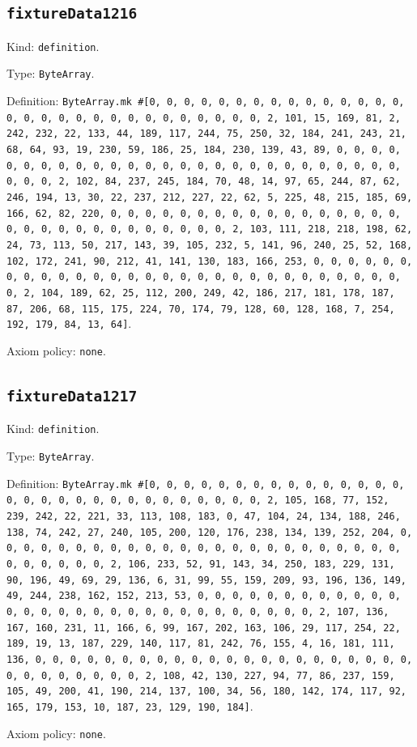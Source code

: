 \documentclass[11pt]{article}
\begin{document}
\subsection*{\texttt{fixtureData1216}}
\noindent Kind: \texttt{definition}.\par
\noindent Type: \texttt{ByteArray}.\par
\noindent Definition: \texttt{ByteArray.mk \#[0, 0, 0, 0, 0, 0, 0, 0, 0, 0, 0, 0, 0, 0, 0, 0, 0, 0, 0, 0, 0, 0, 0, 0, 0, 0, 0, 0, 0, 0, 2, 101, 15, 169, 81, 2, 242, 232, 22, 133, 44, 189, 117, 244, 75, 250, 32, 184, 241, 243, 21, 68, 64, 93, 19, 230, 59, 186, 25, 184, 230, 139, 43, 89, 0, 0, 0, 0, 0, 0, 0, 0, 0, 0, 0, 0, 0, 0, 0, 0, 0, 0, 0, 0, 0, 0, 0, 0, 0, 0, 0, 0, 0, 0, 2, 102, 84, 237, 245, 184, 70, 48, 14, 97, 65, 244, 87, 62, 246, 194, 13, 30, 22, 237, 212, 227, 22, 62, 5, 225, 48, 215, 185, 69, 166, 62, 82, 220, 0, 0, 0, 0, 0, 0, 0, 0, 0, 0, 0, 0, 0, 0, 0, 0, 0, 0, 0, 0, 0, 0, 0, 0, 0, 0, 0, 0, 0, 0, 2, 103, 111, 218, 218, 198, 62, 24, 73, 113, 50, 217, 143, 39, 105, 232, 5, 141, 96, 240, 25, 52, 168, 102, 172, 241, 90, 212, 41, 141, 130, 183, 166, 253, 0, 0, 0, 0, 0, 0, 0, 0, 0, 0, 0, 0, 0, 0, 0, 0, 0, 0, 0, 0, 0, 0, 0, 0, 0, 0, 0, 0, 0, 0, 2, 104, 189, 62, 25, 112, 200, 249, 42, 186, 217, 181, 178, 187, 87, 206, 68, 115, 175, 224, 70, 174, 79, 128, 60, 128, 168, 7, 254, 192, 179, 84, 13, 64]}.\par
\noindent Axiom policy: \texttt{none}.\par
\subsection*{\texttt{fixtureData1217}}
\noindent Kind: \texttt{definition}.\par
\noindent Type: \texttt{ByteArray}.\par
\noindent Definition: \texttt{ByteArray.mk \#[0, 0, 0, 0, 0, 0, 0, 0, 0, 0, 0, 0, 0, 0, 0, 0, 0, 0, 0, 0, 0, 0, 0, 0, 0, 0, 0, 0, 0, 0, 2, 105, 168, 77, 152, 239, 242, 22, 221, 33, 113, 108, 183, 0, 47, 104, 24, 134, 188, 246, 138, 74, 242, 27, 240, 105, 200, 120, 176, 238, 134, 139, 252, 204, 0, 0, 0, 0, 0, 0, 0, 0, 0, 0, 0, 0, 0, 0, 0, 0, 0, 0, 0, 0, 0, 0, 0, 0, 0, 0, 0, 0, 0, 0, 2, 106, 233, 52, 91, 143, 34, 250, 183, 229, 131, 90, 196, 49, 69, 29, 136, 6, 31, 99, 55, 159, 209, 93, 196, 136, 149, 49, 244, 238, 162, 152, 213, 53, 0, 0, 0, 0, 0, 0, 0, 0, 0, 0, 0, 0, 0, 0, 0, 0, 0, 0, 0, 0, 0, 0, 0, 0, 0, 0, 0, 0, 0, 0, 2, 107, 136, 167, 160, 231, 11, 166, 6, 99, 167, 202, 163, 106, 29, 117, 254, 22, 189, 19, 13, 187, 229, 140, 117, 81, 242, 76, 155, 4, 16, 181, 111, 136, 0, 0, 0, 0, 0, 0, 0, 0, 0, 0, 0, 0, 0, 0, 0, 0, 0, 0, 0, 0, 0, 0, 0, 0, 0, 0, 0, 0, 0, 0, 2, 108, 42, 130, 227, 94, 77, 86, 237, 159, 105, 49, 200, 41, 190, 214, 137, 100, 34, 56, 180, 142, 174, 117, 92, 165, 179, 153, 10, 187, 23, 129, 190, 184]}.\par
\noindent Axiom policy: \texttt{none}.\par
\end{document}
